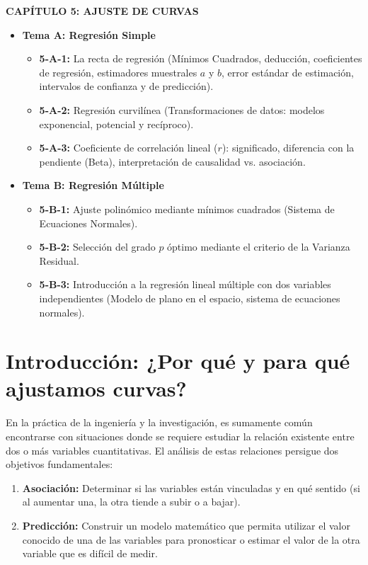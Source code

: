 \documentclass[11pt,a4paper]{article}
\begin{document}
\begin{tcolorbox}[colback=gray!5!white,colframe=gray!50!black,title=Programa Académico Oficial]
    \textbf{CAPÍTULO 5: AJUSTE DE CURVAS}
    \begin{itemize}
        \item \textbf{Tema A: Regresión Simple}
        \begin{itemize}
            \item \textbf{5-A-1:} La recta de regresión (Mínimos Cuadrados, deducción, coeficientes de regresión, estimadores muestrales $a$ y $b$, error estándar de estimación, intervalos de confianza y de predicción).
            \item \textbf{5-A-2:} Regresión curvilínea (Transformaciones de datos: modelos exponencial, potencial y recíproco).
            \item \textbf{5-A-3:} Coeficiente de correlación lineal ($r$): significado, diferencia con la pendiente (Beta), interpretación de causalidad vs. asociación.
        \end{itemize}
        \item \textbf{Tema B: Regresión Múltiple}
        \begin{itemize}
            \item \textbf{5-B-1:} Ajuste polinómico mediante mínimos cuadrados (Sistema de Ecuaciones Normales).
            \item \textbf{5-B-2:} Selección del grado $p$ óptimo mediante el criterio de la Varianza Residual.
            \item \textbf{5-B-3:} Introducción a la regresión lineal múltiple con dos variables independientes (Modelo de plano en el espacio, sistema de ecuaciones normales).
        \end{itemize}
    \end{itemize}
\end{tcolorbox}

\newpage
\section{Introducción: ¿Por qué y para qué ajustamos curvas?}

En la práctica de la ingeniería y la investigación, es sumamente común encontrarse con situaciones donde se requiere estudiar la relación existente entre dos o más variables cuantitativas. El análisis de estas relaciones persigue dos objetivos fundamentales:
\begin{enumerate}
    \item \textbf{Asociación:} Determinar si las variables están vinculadas y en qué sentido (si al aumentar una, la otra tiende a subir o a bajar).
    \item \textbf{Predicción:} Construir un modelo matemático que permita utilizar el valor conocido de una de las variables para pronosticar o estimar el valor de la otra variable que es difícil de medir.
\end{enumerate}
\end{document}
